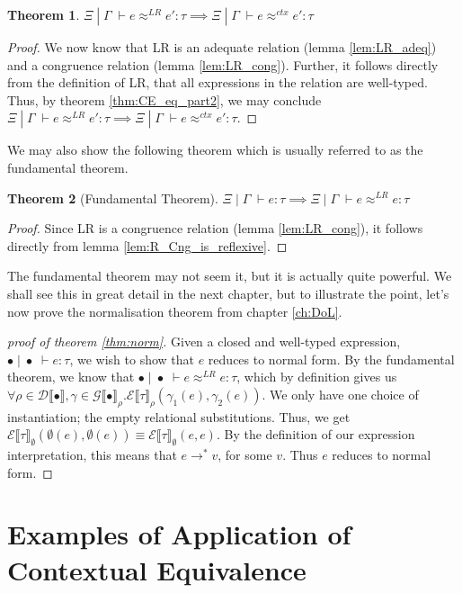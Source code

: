 \documentclass[twoside,11pt,openright]{report}
\newtheorem{theorem}{Theorem}
\theoremstyle{definition}
\newcommand{\expr}{e}
\newcommand{\val}{v}
\newcommand{\typ}{\tau}
\newcommand{\venv}{\Gamma}
\newcommand{\tenv}{\Xi}
\newcommand{\emptenv}{\bullet}
\newcommand{\empvenv}{\bullet}
\newcommand{\jdg}[4]{#1 \; | \; #2 \; \vdash #3 : #4}
\newcommand{\jdgRel}[6]{#1 \; | \; #2 \; \vdash #3 \approx^{#4} #5 : #6}
\newcommand{\ctxRel}[5]{\jdgRel{#1}{#2}{#3}{ctx}{#4}{#5}}
\newcommand{\stepS}{\rightarrow^*}
\newcommand{\ExpInp}[2]{\mathcal{E} \llbracket #1 \rrbracket_{#2}}
\newcommand{\VenvInp}[2]{\mathcal{G} \llbracket #1 \rrbracket_{#2}}
\newcommand{\TenvInp}[1]{\mathcal{D} \llbracket #1 \rrbracket}
\newcommand{\LogRel}[5]{\jdgRel{#1}{#2}{#3}{LR}{#4}{#5}}
\begin{document}
\begin{theorem}\label{thm:LR_sound}
  $\LogRel{\tenv}{\venv}{\expr}{\expr'}{\typ} \implies \ctxRel{\tenv}{\venv}{\expr}{\expr'}{\typ}$
\end{theorem}
\begin{proof}
  We now know that LR is an adequate relation (lemma \ref{lem:LR_adeq}) and a congruence relation (lemma \ref{lem:LR_cong}). Further, it follows directly from the definition of LR, that all expressions in the relation are well-typed. Thus, by theorem \ref{thm:CE_eq_part2}, we may conclude $\LogRel{\tenv}{\venv}{\expr}{\expr'}{\typ} \implies \ctxRel{\tenv}{\venv}{\expr}{\expr'}{\typ}$.
\end{proof}
We may also show the following theorem which is usually referred to as the fundamental theorem.
\begin{theorem}[Fundamental Theorem]\label{thm:fund}
  $\jdg{\tenv}{\venv}{\expr}{\typ} \implies \LogRel{\tenv}{\venv}{\expr}{\expr}{\typ}$
\end{theorem}
\begin{proof}
  Since LR is a congruence relation (lemma \ref{lem:LR_cong}), it follows directly from lemma \ref{lem:R_Cng_is_reflexive}.
\end{proof}
The fundamental theorem may not seem it, but it is actually quite powerful. We shall see this in great detail in the next chapter, but to illustrate the point, let's now prove the normalisation theorem from chapter \ref{ch:DoL}.
\begin{proof}[proof of theorem \ref{thm:norm}]
  Given a closed and well-typed expression, $\jdg{\emptenv}{\empvenv}{\expr}{\typ}$, we wish to show that $\expr$ reduces to normal form. By the fundamental theorem, we know that $\LogRel{\emptenv}{\empvenv}{\expr}{\expr}{\typ}$, which by definition gives us $\forall \rho \in \TenvInp{\emptenv}, \gamma \in \VenvInp{\empvenv}{\rho} . \ExpInp{\typ}{\rho}(\gamma_1(\expr), \gamma_2(\expr))$. We only have one choice of instantiation; the empty relational substitutions. Thus, we get $\ExpInp{\typ}{\emptyset}(\emptyset(\expr), \emptyset(\expr)) \equiv \ExpInp{\typ}{\emptyset}(\expr, \expr)$. By the definition of our expression interpretation, this means that $\expr \stepS \val$, for some $\val$. Thus $\expr$ reduces to normal form.
\end{proof}



\chapter{Examples of Application of Contextual Equivalence}
\label{ch:ACE}
\end{document}
